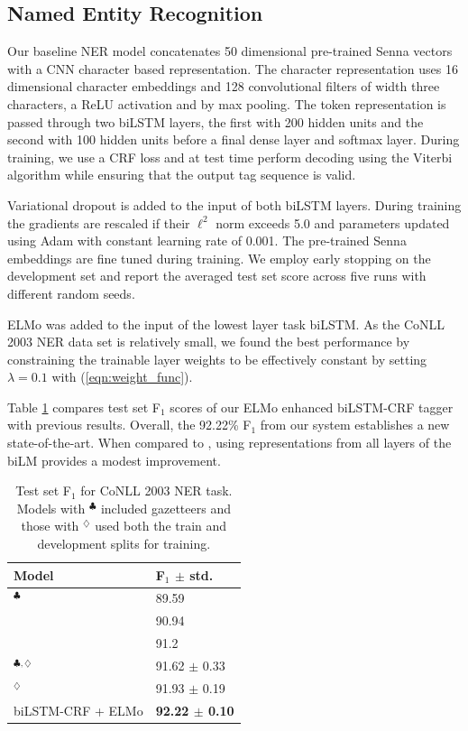 \documentclass[11pt,a4paper]{article}
\newcommand{\ELMO}{ELMo}
\begin{document}
\subsection{Named Entity Recognition}
Our baseline NER model concatenates 50 dimensional pre-trained Senna vectors \citep{NLPfromScratch:Collobert2011} with a CNN character based representation.  The character representation uses 16 dimensional character embeddings and 128 convolutional filters of width three characters, a ReLU activation and by max pooling.  The token representation is passed through two biLSTM layers, the first with 200 hidden units and the second with 100 hidden units before a final dense layer and softmax layer.
During training, we use a CRF loss and at test time perform decoding using the Viterbi algorithm while ensuring that the output tag sequence is valid.

Variational dropout is added to the input of both biLSTM layers.
During training the gradients are rescaled if their $\ell^2$ norm exceeds 5.0 and parameters updated using Adam with constant learning rate of 0.001.
The pre-trained Senna embeddings are fine tuned during training.
We employ early stopping on the development set and report the averaged test set score across five runs with different random seeds.

\ELMO{} was added to the input of the lowest layer task biLSTM.
As the CoNLL 2003 NER data set is relatively small, we found the best performance by
constraining the trainable layer weights to be effectively constant by setting $\lambda=0.1$ with (\ref{eqn:weight_func}).

Table \ref{table:ner_test} compares test set F$_1$ scores of our \ELMO{} enhanced biLSTM-CRF tagger with previous results. 
Overall, the 92.22\% F$_1$ from our system establishes a new state-of-the-art.
When compared to \citet{Peters2017SemisupervisedST}, using representations from all layers of the biLM provides a modest improvement.



\begin{table}
\centering
\begin{tabular}{l|l}
\textbf{Model}                                & \textbf{F$_1$ $\pm$ std.} \\ \hline \hline
\citet{NLPfromScratch:Collobert2011}$^\clubsuit$ & 89.59 \\
\citet{lample-EtAl:2016:N16-1} & 90.94 \\
\citet{Ma2016EndtoendSL}                & 91.2     \\
\citet{chiu-nichols-2016}$^{\clubsuit,\diamondsuit}$         & 91.62 $\pm$ 0.33  \\
\citet{Peters2017SemisupervisedST}$^\diamondsuit$     & 91.93 $\pm$ 0.19   \\
biLSTM-CRF + \ELMO   & \textbf{92.22 $\pm$ 0.10}
\end{tabular}
\caption{Test set F$_1$ for CoNLL 2003 NER task.
Models with $^\clubsuit$ included gazetteers and those with $^\diamondsuit$ used both the train and development splits for training.
}
\label{table:ner_test}
\end{table}
\end{document}
